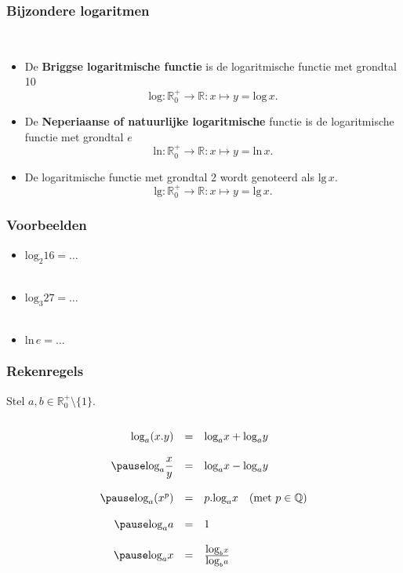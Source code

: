 \begin{frame}  
\frametitle{Bijzondere logaritmen} 
\pause
\begin{definitie}~
\begin{itemize}
\item<+-> De {\bfseries Briggse logaritmische functie} is de logaritmische functie met grondtal 10
\[\mbox{log}:\mathbb{R}^+_0 \rightarrow \mathbb{R}: x \mapsto y=\mbox{log}\, x.\]
\item<+-> De {\bfseries Neperiaanse of natuur\-lijke logaritmische} functie is de logaritmische functie met grondtal $e$
\[\mbox{ln}:\mathbb{R}^+_0 \rightarrow \mathbb{R}: x \mapsto y=\mbox{ln}\, x.\]
\item<+-> De logaritmische functie met grondtal $2$ wordt genoteerd als $\mbox{lg}\, x$. 
\[\mbox{lg}:\mathbb{R}^+_0 \rightarrow \mathbb{R}: x \mapsto y=\mbox{lg}\, x.\]
\end{itemize}
\end{definitie}
\end{frame}

\begin{frame}
\frametitle{Voorbeelden}
\pause 
\begin{itemize}
\item<+-> $\mbox{log}_2 16 = \ldots $\\~
\item<+-> $\mbox{log}_3 27 = \ldots $\\~
\item<+-> $\mbox{ln}\, e = \ldots$
\end{itemize}
\end{frame}

\begin{frame}
\frametitle{Rekenregels} 
\pause
\begin{eigenschap}
Stel $a,b \in \mathbb{R}_0^+\setminus\{1\}$.\\~\\
\pause 
\[\begin{array}{rcl}
  \mbox{log}_a(x.y) & = & \mbox{log}_a x + \mbox{log}_a y \\~\\\pause
  \mbox{log}_a\displaystyle \frac{x}{y} & = & \mbox{log}_a x - \mbox{log}_a y \\~\\\pause
  \mbox{log}_a(x^p) & = & p.\mbox{log}_a x  ~~~(\mbox{met } p \in \mathbb{Q})\\ ~\\\pause
  \mbox{log}_a a & = & 1 \\~\\ \pause
  \mbox{log}_a x & = & \frac{\mbox{log}_b x}{\mbox{log}_b a}
  \end{array}\]
\end{eigenschap}~\\
\end{frame}

